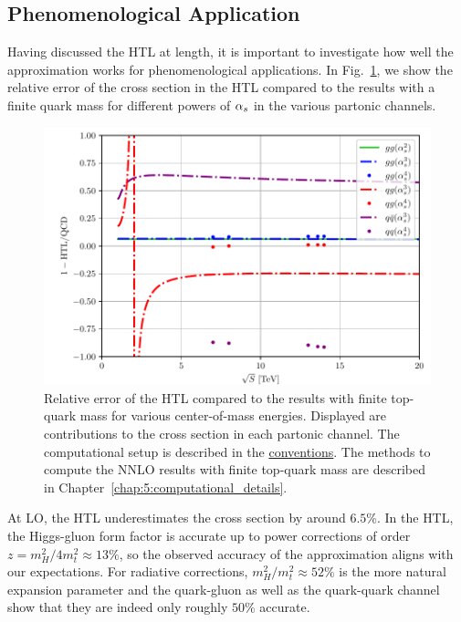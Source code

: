 \subsection{Phenomenological Application} \label{subsec:4:phenomenological_application}
Having discussed the \acs{HTL} at length, it is important to investigate how well the approximation works for phenomenological applications. In Fig.~\ref{fig:4:HTL_accuracy}, we show the relative error of the cross section in the \acs{HTL} compared to the results with a finite quark mass for different powers of $\alpha_s$ in the various partonic channels.

\begin{figure}[ht]
\centering
\includegraphics[width=\figurewidth]{Images/HTL_accuracy.pdf}
\caption{Relative error of the \acs{HTL} compared to the results with finite top-quark mass for various center-of-mass energies. Displayed are contributions to the cross section in each partonic channel. The computational setup is described in the \hyperref[chap:notation_and_conventions]{conventions}. The methods to compute the \acs{NNLO} results with finite top-quark mass are described in Chapter~\ref{chap:5:computational_details}.}
\label{fig:4:HTL_accuracy}
\end{figure}
At \acs{LO}, the \acs{HTL} underestimates the cross section by around $6.5$\%. In the \acs{HTL}, the Higgs-gluon form factor is accurate up to power corrections of order $z = m_H^2/4m_t^2 \approx 13\%$, so the observed accuracy of the approximation aligns with our expectations. For radiative corrections, $m_H^2/m_t^2 \approx 52\%$ is the more natural expansion parameter and the quark-gluon as well as the quark-quark channel show that they are indeed only roughly $50\%$ accurate.


